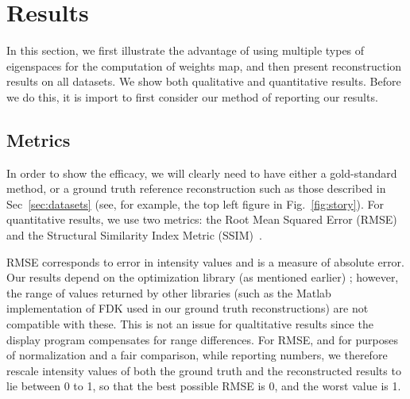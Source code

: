 \documentclass[journal]{IEEEtran}
\begin{document}
\section{Results}
\label{sec:results_spatially_varying_prior}


In this section, we first illustrate the advantage of using multiple
types of eigenspaces for the computation of weights map, and then
present reconstruction results on all datasets.  We show both
qualitative and quantitative results.  Before we do this, it is import
to first consider our method of reporting our results.

\subsection{Metrics}
In order to show the efficacy, we will clearly need to have either a
gold-standard method, or a ground truth reference reconstruction such
as those described in Sec~\ref{sec:datasets} (see, for example, the
top left figure in Fig.~\ref{fig:story}).  For quantitative results,
we use two metrics: the Root Mean Squared Error (RMSE) and the
Structural Similarity Index Metric (SSIM)~\cite{ssim}.

RMSE corresponds to error in intensity values and is a measure of
absolute error. Our results depend on the optimization library (as
mentioned earlier) \cite{TVReg-lib}; however, the range of values
returned by other libraries (such as the Matlab implementation of FDK
used in our ground truth reconstructions) are not compatible with
these.  This is not an issue for qualtitative results since the
display program compensates for range differences. For RMSE, and
for purposes of normalization and a fair comparison, while reporting
numbers, we therefore rescale intensity values of both the ground
truth and the reconstructed results to lie between 0 to 1, so that the
best possible RMSE is 0, and the worst value is 1.
\end{document}
